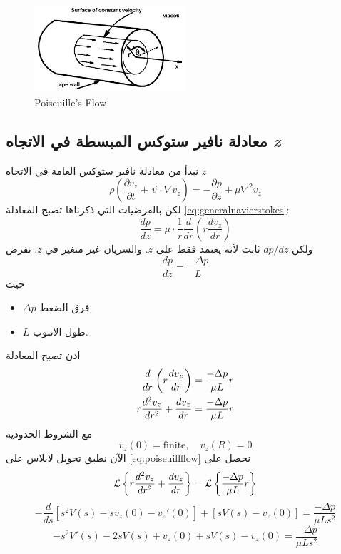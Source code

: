 \begin{english}
	\begin{figure}[ht]
		\centering
		\includegraphics[width=0.5\textwidth]{Figures/pe.jpg}
		\caption{Poiseuille's Flow}
	\end{figure}
\end{english}

\subsection*{معادلة نافير ستوكس المبسطة في الاتجاه \textit{z}}
نبدأ من معادلة نافير ستوكس العامة في الاتجاه $z$ 
\begin{equation}
	\label{eq:generalnavierstokes}
	\rho\left(
	\frac{\partial v_z}{\partial t} + \vec{v} \cdot \nabla v_z 
	\right)
	= - \frac{\partial p}{\partial z} + \mu \nabla^2 v_z
\end{equation}
لكن بالفرضيات التي ذكرناها تصبح المعادلة \eqref{eq:generalnavierstokes}:
\[
\frac{dp }{dz} = \mu \cdot \frac{1}{r} \frac{d}{dr} \left(r \frac{dv_z}{dr}\right)
\]
ولكن $dp/dz$ ثابت لأنه يعتمد فقط على $z$. والسريان غير متغير في $z$. نفرض
\[
\frac{dp}{dz} = \frac{- \Delta p}{L}
\]
حيث 
\begin{itemize}
	\item $\Delta p$ فرق الضغط.
	\item  $L$ طول الانبوب.
\end{itemize}
اذن تصبح المعادلة 
\begin{align}
	\frac{d}{dr} \left(r \frac{dv_z}{dr}\right) = \frac{-\Delta p}{\mu L} r \notag\\
		\label{eq:poiseuillflow}
		r \frac{d^2 v_z}{dr^2} + \frac{dv_z}{dr} =  \frac{-\Delta p}{\mu L} r 
\end{align}
مع الشروط الحدودية
\[
v_z(0) = \text{finite}, \quad v_z(R) = 0
\]
الآن نطبق تحويل لابلاس على \eqref{eq:poiseuillflow} نحصل على
\[
\mathcal{L}\left\{r \frac{d^2 v_z}{dr^2} + \frac{dv_z}{dr}\right\} = \mathcal{L}\left\{\frac{-\Delta p}{\mu L} r\right\}
\]
\[
-\frac{d}{ds} \left[s^2 V(s) - s v_z(0) - v_z'(0)\right] + \left[sV(s) - v_z(0)\right] =  \frac{-\Delta p}{\mu L s^2}
\]
\[
-s^2V'(s) -2s V(s) + v_z(0) + sV(s) - v_z(0) = \frac{-\Delta p}{\mu L s^2}
\]
